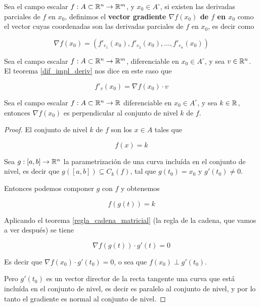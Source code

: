 \begin{definition}[Gradiente]
Sea el campo escalar $ f : A \subset \mathbb{R}^n \to \mathbb{R}^m$, y $x_0 \in A^{\circ}$, si existen las derivadas parciales de $f$ en $x_0$, definimos el \textbf{vector gradiente $\nabla f(x_0)$ de $f$ en $x_0$}  como el vector cuyas coordenadas son las derivadas parciales de $f$ en $x_0$, es decir como

$$ \nabla f(x_0) = (f'_{e_1}(x_0), f'_{e_2}(x_0), \ldots, f'_{e_n}(x_0) ) $$
\end{definition}

\begin{observation} \label{graderiv}
Sea el campo escalar $ f : A \subset \mathbb{R}^n \to \mathbb{R}^m$, diferenciable en $x_0 \in A^{\circ}$, y sea $v \in \mathbb{R}^n$. El teorema \ref{dif_impl_deriv} nos dice en este caso que

$$ f'_v(x_0) = \nabla f(x_0) \cdot v $$
\end{observation}

\begin{observation}
Sea el campo escalar $ f : A \subset \mathbb{R}^n \to \mathbb{R}$ diferenciable en $x_0 \in A^{\circ}$, y sea $ k \in \mathbb{R}$, entonces $ \nabla f(x_0)$ es perpendicular al conjunto de nivel $k$ de $f$.
\end{observation}

\begin{proof}

El conjunto de nivel $k$ de $f$ son los $x \in A$ tales que

$$ f(x) = k $$

Sea $ g:[a,b] \to \mathbb{R}^n$ la parametrización de una curva incluída en el conjunto de nivel, es decir que $g([a,b]) \subseteq C_k(f)$, tal que $g(t_0) = x_0$ y $g'(t_0) \neq 0$.

Entonces podemos componer $g$ con $f$ y obtenemos

$$ f(g(t)) = k $$

Aplicando el teorema \ref{regla_cadena_matricial} (la regla de la cadena, que vamos a ver después) se tiene

$$ \nabla f(g(t)) \cdot g'(t) = 0 $$

Es decir que $ \nabla f(x_0) \cdot g'(t_0) = 0$, o sea que $ f(x_0) \perp g'(t_0)$.  

Pero $ g'(t_0)$ es un vector director de la recta tangente una curva que está incluída en el conjunto de nivel, es decir es paralelo al conjunto de nivel, y por lo tanto el gradiente es normal al conjunto de nivel.

\end{proof}


